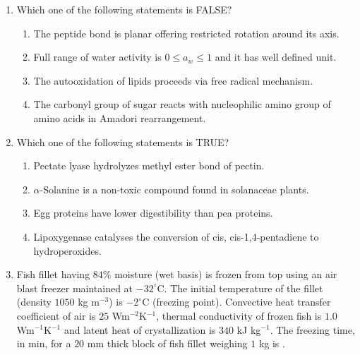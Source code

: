 \documentclass[a4paper,10pt]{article}
\begin{document}
\begin{enumerate}
    \hfill{}
    \begin{enumerate}
    \end{enumerate}
    
    \item Which one of the following statements is FALSE?
    
    \hfill{}
    \begin{enumerate}
        \item The peptide bond is planar offering restricted rotation around its axis.
        \item Full range of water activity is $0 \le a_w \le 1$ and it has well defined unit.
        \item The autooxidation of lipids proceeds via free radical mechanism.
        \item The carbonyl group of sugar reacts with nucleophilic amino group of amino acids in Amadori rearrangement.
    \end{enumerate}
    
    \item Which one of the following statements is TRUE?
    
    \hfill{}
    \begin{enumerate}
        \item Pectate lyase hydrolyzes methyl ester bond of pectin.
        \item $\alpha$-Solanine is a non-toxic compound found in solanaceae plants.
        \item Egg proteins have lower digestibility than pea proteins.
        \item Lipoxygenase catalyses the conversion of cis, cis-1,4-pentadiene to hydroperoxides.
    \end{enumerate}
    
    \item Fish fillet having $84\%$ moisture (wet basis) is frozen from top using an air blast freezer maintained at $-32^\circ$C. The initial temperature of the fillet (density $1050$ kg m$^{-3}$) is $-2^\circ$C (freezing point). Convective heat transfer coefficient of air is $25$ Wm$^{-2}$K$^{-1}$, thermal conductivity of frozen fish is $1.0$ Wm$^{-1}$K$^{-1}$ and latent heat of crystallization is $340$ kJ kg$^{-1}$. The freezing time, in min, for a $20$ mm thick block of fish fillet weighing $1$ kg is \underline{\hspace{2cm}}.
    

\end{enumerate}
\end{document}
